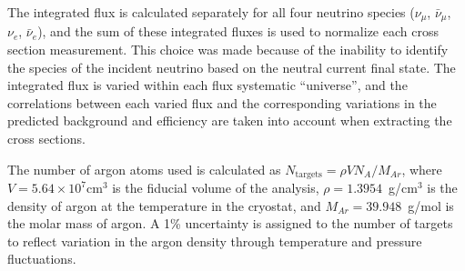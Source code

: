 The integrated flux is calculated separately for all four neutrino species ($\nu_{\mu}$, $\bar{\nu}_{\mu}$, $\nu_{e}$, $\bar{\nu}_{e}$), and the sum of these integrated fluxes is used to normalize each cross section measurement. This choice was made because of the inability to identify the species of the incident neutrino based on the neutral current final state. The integrated flux is varied within each flux systematic ``universe'', and the correlations between each varied flux and the corresponding variations in the predicted background and efficiency are taken into account when extracting the cross sections.

The number of argon atoms used is calculated as $N_{\text{targets}} = \rho V N_A/M_{Ar}$, where $V = 5.64\times10^{7} \text{cm}^3$ is the fiducial volume of the analysis, $\rho = 1.3954$~g/cm$^3$ is the density of argon at the temperature in the cryostat, and $M_{Ar} = 39.948$~g/mol is the molar mass of argon. A 1\% uncertainty is assigned to the number of targets to reflect variation in the argon density through temperature and pressure fluctuations.

